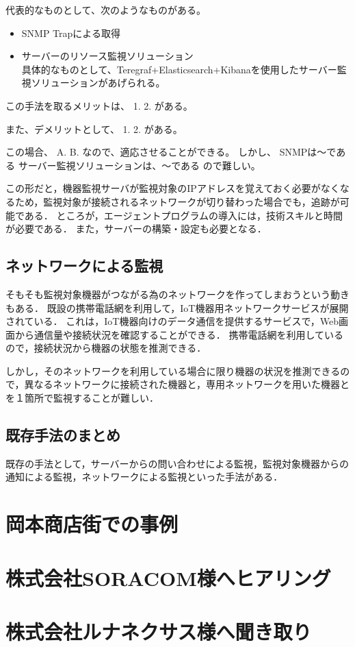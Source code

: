 	代表的なものとして、次のようなものがある。
	\begin{itemize}
		\item SNMP Trapによる取得
		\item サーバーのリソース監視ソリューション\\
			具体的なものとして、Teregraf+Elasticsearch+Kibanaを使用したサーバー監視ソリューションがあげられる。
	\end{itemize}
	
	この手法を取るメリットは、
	1.
	2.
	がある。

	また、デメリットとして、
	1.
	2.
	がある。

	この場合、
	A.
	B.
	なので、適応させることができる。
	しかし、
	SNMPは〜である
	サーバー監視ソリューションは、〜である
	ので難しい。

	この形だと，機器監視サーバが監視対象のIPアドレスを覚えておく必要がなくなるため，監視対象が接続されるネットワークが切り替わった場合でも，追跡が可能である．
	ところが，エージェントプログラムの導入には，技術スキルと時間が必要である．
	また，サーバーの構築・設定も必要となる．

\subsection{ネットワークによる監視} %
	

	そもそも監視対象機器がつながる為のネットワークを作ってしまおうという動きもある．
	既設の携帯電話網を利用して，IoT機器用ネットワークサービスが展開されている．
	これは，IoT機器向けのデータ通信を提供するサービスで，Web画面から通信量や接続状況を確認することができる．
	携帯電話網を利用しているので，接続状況から機器の状態を推測できる．

	しかし，そのネットワークを利用している場合に限り機器の状況を推測できるので，異なるネットワークに接続された機器と，専用ネットワークを用いた機器とを１箇所で監視することが難しい．

\subsection{既存手法のまとめ}
	既存の手法として，サーバーからの問い合わせによる監視，監視対象機器からの通知による監視，ネットワークによる監視といった手法がある．

\section{岡本商店街での事例}


\section{株式会社SORACOM様へヒアリング}


\section{株式会社ルナネクサス様へ聞き取り}







